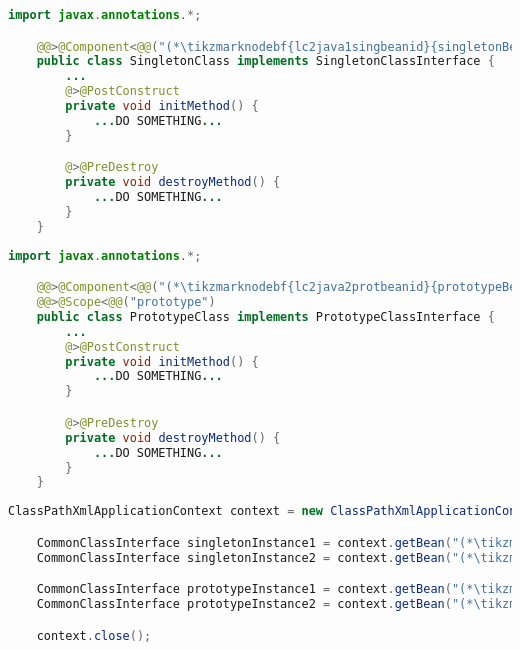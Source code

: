 \example
\enlargethispage{10mm}
\begin{lstlisting}[language=Java, title={Singleton bean class}]
    import javax.annotations.*;

    @@>@Component<@@("(*\tikzmarknodebf{lc2java1singbeanid}{singletonBeanId}[ForestGreen]*)")
    public class SingletonClass implements SingletonClassInterface {
        ...
        @>@PostConstruct
        private void initMethod() {
            ...DO SOMETHING...
        }

        @>@PreDestroy
        private void destroyMethod() {
            ...DO SOMETHING...
        }
    }
\end{lstlisting}
\begin{lstlisting}[language=Java, title={Prototype bean class}]
    import javax.annotations.*;

    @@>@Component<@@("(*\tikzmarknodebf{lc2java2protbeanid}{prototypeBeanId}[ForestGreen]*)")
    @@>@Scope<@@("prototype")
    public class PrototypeClass implements PrototypeClassInterface {
        ...
        @>@PostConstruct
        private void initMethod() {
            ...DO SOMETHING...
        }

        @>@PreDestroy
        private void destroyMethod() {
            ...DO SOMETHING...
        }
    }
\end{lstlisting}
\newpage
\begin{lstlisting}[language=Java, title={Usage}]
    ClassPathXmlApplicationContext context = new ClassPathXmlApplicationContext("configurationFile.xml");

    CommonClassInterface singletonInstance1 = context.getBean("(*\tikzmarknodebf{lc2java3singbeanid1}{singletonBeanId}[ForestGreen]*)", SingletonClassInterface.class);
    CommonClassInterface singletonInstance2 = context.getBean("(*\tikzmarknodebf{lc2java3singbeanid2}{singletonBeanId}[ForestGreen]*)", SingletonClassInterface.class);

    CommonClassInterface prototypeInstance1 = context.getBean("(*\tikzmarknodebf{lc2java3protbeanid1}{prototypeBeanId}[ForestGreen]*)", PrototypeClassInterface.class);
    CommonClassInterface prototypeInstance2 = context.getBean("(*\tikzmarknodebf{lc2java3protbeanid2}{prototypeBeanId}[ForestGreen]*)", PrototypeClassInterface.class);

    context.close();
\end{lstlisting}
